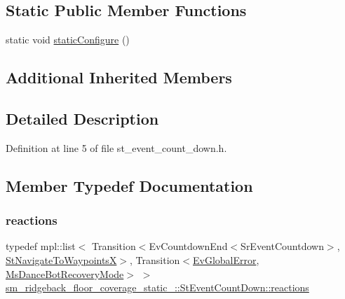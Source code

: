 \subsection*{Static Public Member Functions}
\begin{DoxyCompactItemize}
\item 
static void \hyperlink{structsm__ridgeback__floor__coverage__static__1_1_1StEventCountDown_aef24befbf9c60e4f9c3e068d13c69728}{static\+Configure} ()
\end{DoxyCompactItemize}
\subsection*{Additional Inherited Members}


\subsection{Detailed Description}


Definition at line 5 of file st\+\_\+event\+\_\+count\+\_\+down.\+h.



\subsection{Member Typedef Documentation}
\mbox{\label{structsm__ridgeback__floor__coverage__static__1_1_1StEventCountDown_a8a50d333167a3f6846dde61cda0d0b43}} 
\subsubsection{\texorpdfstring{reactions}{reactions}}
{\footnotesize\ttfamily typedef mpl\+::list$<$ Transition$<$Ev\+Countdown\+End$<$Sr\+Event\+Countdown$>$, \hyperlink{structsm__ridgeback__floor__coverage__static__1_1_1StNavigateToWaypointsX}{St\+Navigate\+To\+WaypointsX}$>$, Transition$<$\hyperlink{structsm__ridgeback__floor__coverage__static__1_1_1EvGlobalError}{Ev\+Global\+Error}, \hyperlink{classsm__ridgeback__floor__coverage__static__1_1_1MsDanceBotRecoveryMode}{Ms\+Dance\+Bot\+Recovery\+Mode}$>$ $>$ \hyperlink{structsm__ridgeback__floor__coverage__static__1_1_1StEventCountDown_a8a50d333167a3f6846dde61cda0d0b43}{sm\+\_\+ridgeback\+\_\+floor\+\_\+coverage\+\_\+static\+\_\+::\+St\+Event\+Count\+Down\+::reactions}}



